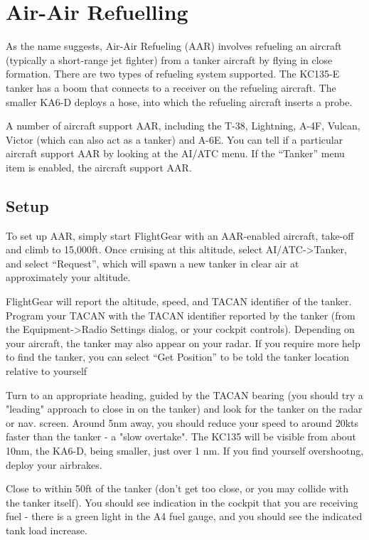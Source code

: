 \section{Air-Air Refuelling}\label{aar}

As the name suggests, Air-Air Refueling (AAR) involves refueling an aircraft
(typically a short-range jet fighter) from a tanker aircraft by flying in close
formation. There are two types of refueling system supported. The KC135-E tanker
has a boom that connects to a receiver on the refueling aircraft. The smaller
KA6-D deploys a hose, into which the refueling aircraft inserts a probe.

A number of aircraft support AAR, including the T-38, Lightning, A-4F, Vulcan,
Victor (which can also act as a tanker) and A-6E. You can tell if a particular
aircraft support AAR by looking at the AI/ATC menu. If the ``Tanker'' menu item
is enabled, the aircraft support AAR.

\subsection{Setup}

To set up AAR, simply start FlightGear with an AAR-enabled aircraft, take-off
and climb to 15,000ft. Once cruising at this altitude, select AI/ATC->Tanker,
and select ``Request'', which will spawn a new tanker in clear air at
approximately your altitude.

FlightGear will report the altitude, speed, and TACAN identifier of the tanker.
Program your TACAN with the TACAN identifier reported by the tanker (from the
Equipment->Radio Settings dialog, or your cockpit controls). Depending on your
aircraft, the tanker may also appear on your radar. If you require more help to
find the tanker, you can select ``Get Position'' to be told the tanker
location relative to yourself

Turn to an appropriate heading, guided by the TACAN bearing (you should
try a "leading" approach to close in on the tanker) and look for the
tanker on the radar or nav. screen.  Around 5nm away, you should reduce
your speed to around 20kts faster than the tanker - a "slow overtake".  The
KC135 will be visible from about 10nm, the KA6-D, being smaller, just over 1 nm.
If you find yourself overshootng, deploy your airbrakes.

Close to within 50ft of the tanker (don't get too close, or you may collide with
the tanker itself).  You should see indication in
the cockpit that you are receiving fuel - there is a green light in the
A4 fuel gauge, and you should see the indicated tank load increase.

